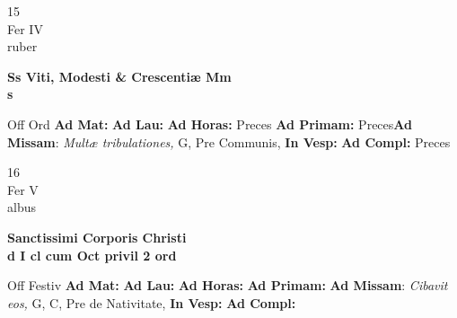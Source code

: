 \documentclass[10pt, openany]{book}
\begin{document}
    \begin{center}
        \begin{minipage}{3.5in}
            \vspace{2em}
            \begin{minipage}{0.5in}
                {\Huge 15} \\
                {\normalsize Fer IV} \\
                {\normalsize ruber}
            \end{minipage}
            \begin{minipage}{3.0in}
                \textbf{ \large Ss Viti, Modesti \& Crescentiæ Mm \\
                \textnormal{\normalsize s}} \\ 
            \end{minipage}
            \begin{justify}Off Ord
                \textbf{Ad Mat: }
                \textbf{Ad Lau: }
                \textbf{Ad Horas: }Preces
                \textbf{Ad Primam: }Preces\textbf{Ad Missam}: \textit{Multæ tribulationes,} G, Pre Communis,  
                \textbf{In Vesp: }
                \textbf{Ad Compl: }Preces
            \end{justify}
        \end{minipage}
    \end{center}

    \begin{center}
        \begin{minipage}{3.5in}
            \vspace{2em}
            \begin{minipage}{0.5in}
                {\Huge 16} \\
                {\normalsize Fer V} \\
                {\normalsize albus}
            \end{minipage}
            \begin{minipage}{3.0in}
                \textbf{ \large Sanctissimi Corporis Christi \\
                \textnormal{\normalsize d I cl cum Oct privil 2 ord}} \\ 
            \end{minipage}
            \begin{justify}Off Festiv
                \textbf{Ad Mat: }
                \textbf{Ad Lau: }
                \textbf{Ad Horas: }
                \textbf{Ad Primam: }\textbf{Ad Missam}: \textit{Cibavit eos,} G, C, Pre de Nativitate,  
                \textbf{In Vesp: }
                \textbf{Ad Compl: }
            \end{justify}
        \end{minipage}
    \end{center}
\end{document}
